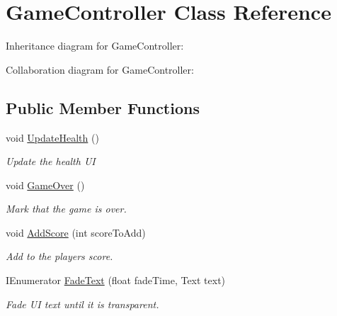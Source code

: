 \hypertarget{class_game_controller}{}\section{Game\+Controller Class Reference}
\label{class_game_controller}


Inheritance diagram for Game\+Controller\+:


Collaboration diagram for Game\+Controller\+:
\subsection*{Public Member Functions}
\begin{DoxyCompactItemize}
\item 
void \mbox{\hyperlink{class_game_controller_a956f2ce4aae2c7f4f4bd17a2b7e01af8}{Update\+Health}} ()
\begin{DoxyCompactList}\small\item\em Update the health UI \end{DoxyCompactList}\item 
void \mbox{\hyperlink{class_game_controller_a867b359e465ba013eec7f1ee03b75118}{Game\+Over}} ()
\begin{DoxyCompactList}\small\item\em Mark that the game is over. \end{DoxyCompactList}\item 
void \mbox{\hyperlink{class_game_controller_a313aab47cf055f36c3d0ae5de701a00e}{Add\+Score}} (int score\+To\+Add)
\begin{DoxyCompactList}\small\item\em Add to the player\textquotesingle{}s score. \end{DoxyCompactList}\item 
I\+Enumerator \mbox{\hyperlink{class_game_controller_ae866cbc811f8f18f599b2f238d8e086f}{Fade\+Text}} (float fade\+Time, Text text)
\begin{DoxyCompactList}\small\item\em Fade UI text until it is transparent. \end{DoxyCompactList}\end{DoxyCompactItemize}
